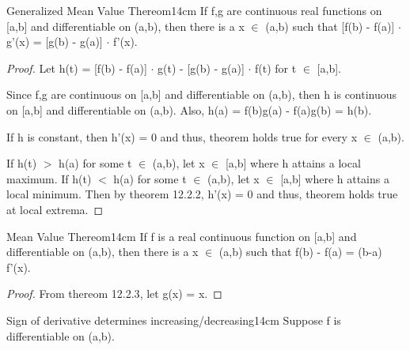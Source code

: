     \vspace{0.5cm}



    \begin{wtheorem}{Generalized Mean Value Thereom}{14cm}
        If f,g are continuous real functions on [a,b] and differentiable on
        (a,b), then there is a x $\in$ (a,b) such that
        [f(b) - f(a)] $\cdot$ g'(x) = [g(b) - g(a)] $\cdot$ f'(x).        
    \end{wtheorem}

    \begin{proof}
        Let h(t) = [f(b) - f(a)] $\cdot$ g(t) - [g(b) - g(a)] $\cdot$ f(t)
        for t $\in$ [a,b].

        Since f,g are continuous on [a,b] and differentiable on (a,b),
        then h is continuous on [a,b] and differentiable on (a,b).
        Also, h(a) = f(b)g(a) - f(a)g(b) = h(b).

        If h is constant, then h'(x) = 0 and thus, theorem holds true for
        every x $\in$ (a,b).

        If h(t) $>$ h(a) for some t $\in$ (a,b), let x $\in$ [a,b] where
        h attains a local maximum.
        If h(t) $<$ h(a) for some t $\in$ (a,b), let x $\in$ [a,b] where
        h attains a local minimum.
        Then by {\color{red} theorem 12.2.2}, h'(x) = 0 and thus, theorem
        holds true at local extrema.
    \end{proof}

    \newpage



    \begin{wtheorem}{Mean Value Thereom}{14cm}
        If f is a real continuous function on [a,b] and differentiable on (a,b),
        then there is a x $\in$ (a,b) such that f(b) - f(a) = (b-a) f'(x).        
    \end{wtheorem}

    \begin{proof}
        From {\color{red} thereom 12.2.3}, let g(x) = x.
    \end{proof}

    \vspace{0.5cm}



    \begin{wtheorem}{Sign of derivative determines increasing/decreasing}{14cm}
        Suppose f is differentiable on (a,b).
    \end{wtheorem}

